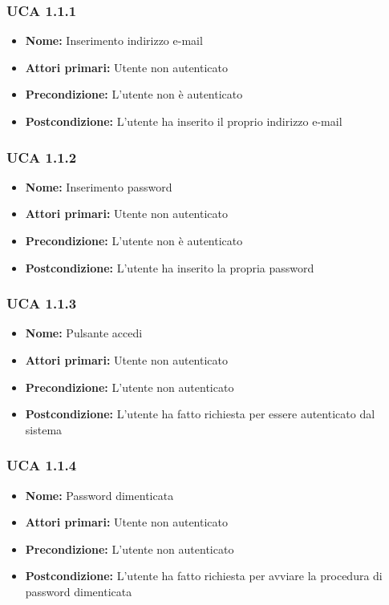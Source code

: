 \documentclass[a4paper, oneside, dvipsnames, table]{article} %
\begin{document}
\subsubsection{UCA 1.1.1}%
\begin{itemize}
\item \textbf{Nome:} Inserimento indirizzo e-mail
\item \textbf{Attori primari:}  Utente non autenticato
\item \textbf{Precondizione:}  L’utente non è autenticato
\item \textbf{Postcondizione:}  L’utente ha inserito il proprio indirizzo e-mail
\end{itemize}

\subsubsection{UCA 1.1.2}%
\begin{itemize}
\item \textbf{Nome:} Inserimento password
\item \textbf{Attori primari:} Utente non autenticato
\item \textbf{Precondizione:} L’utente non è autenticato
\item \textbf{Postcondizione:} L’utente ha inserito la propria password
\end{itemize}

\subsubsection{UCA 1.1.3}%
\begin{itemize}
\item \textbf{Nome:} Pulsante accedi
\item \textbf{Attori primari:} Utente non autenticato
\item \textbf{Precondizione:} L'utente non autenticato
\item \textbf{Postcondizione:} L'utente ha fatto richiesta per essere autenticato dal sistema 
\end{itemize}

\subsubsection{UCA 1.1.4}%
\begin{itemize}
\item \textbf{Nome:} Password dimenticata
\item \textbf{Attori primari:} Utente non autenticato
\item \textbf{Precondizione:}  L'utente non autenticato
\item \textbf{Postcondizione:} L'utente ha fatto richiesta per avviare la procedura di password dimenticata
\end{itemize}
\end{document}

